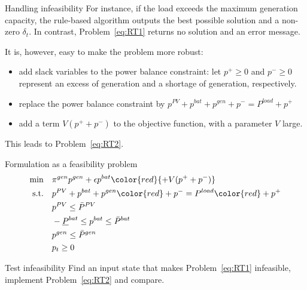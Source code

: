\begin{frame}{Handling infeasibility}
For instance, if the load exceeds the maximum generation capacity, the rule-based algorithm outputs the best possible solution and a non-zero $\delta_t$. 
In contrast, Problem~\eqref{eq:RT1} returns no solution and an error message. 

It is, however, easy to make the problem more robust: 
\begin{itemize}
    \item add slack variables to the power balance constraint: let $p^+ \geq 0$ and $p^- \geq 0$ represent an excess of generation and a shortage of generation, respectively. 
    \item replace the power balance constraint by $p^{PV}+p^{bat}+p^{gen} + p^-= P^{load} + p^+$
    \item add a term $V (p^+ + p^-)$ to the objective function, with a parameter $V$ large.
\end{itemize} 

This leads to Problem~\eqref{eq:RT2}.
\end{frame}

\begin{frame}{Formulation as a feasibility problem}
\begin{subequations}
	\label{eq:RT2}
\begin{align}
\min        \quad  & \pi^{gen} p^{gen}  + \epsilon p^{bat} \color{red}{+ V (p^+ + p^-)} \label{eq:obj_2}\\
\text{s.t.} \quad  & p^{PV}+p^{bat} +p^{gen} {\color{red}+ p^-}  = P^{load} {\color{red} + p^+}  \label{eq:bal_2} \\
                   & p^{PV} \leq \bar{P}^{PV}  \label{eq:PV_2}\\
                   & -\underline{P}^{bat} \leq p^{bat} \leq \bar{P}^{bat}  \label{eq:bat_2}\\
                   & p^{gen} \leq \bar{P}^{gen}  \label{eq:gen_2}\\
                   & p_t \geq 0  \label{eq:nonneg_2}
\end{align}
\end{subequations}

\begin{block}{Test infeasibility}
    Find an input state that makes Problem~\eqref{eq:RT1} infeasible, implement Problem~\eqref{eq:RT2} and compare.
\end{block}

\end{frame}

